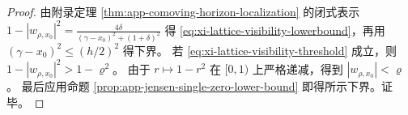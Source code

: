 \begin{proof}
由附录定理 \ref{thm:app-comoving-horizon-localization} 的闭式表示
\(
1-|w_{\rho,x_0}|^2=\frac{4\delta}{(\gamma-x_0)^2+(1+\delta)^2}
\)
得 \eqref{eq:xi-lattice-visibility-lowerbound}，再用 \((\gamma-x_0)^2\le (h/2)^2\) 得下界。
若 \eqref{eq:xi-lattice-visibility-threshold} 成立，则 \(1-|w_{\rho,x_0}|^2>1-\varrho^2\)。
由于 \(r\mapsto 1-r^2\) 在 \([0,1)\) 上严格递减，得到 \(|w_{\rho,x_0}|<\varrho\)。
最后应用命题 \ref{prop:app-jensen-single-zero-lower-bound} 即得所示下界。证毕。
\end{proof}

\endinput
